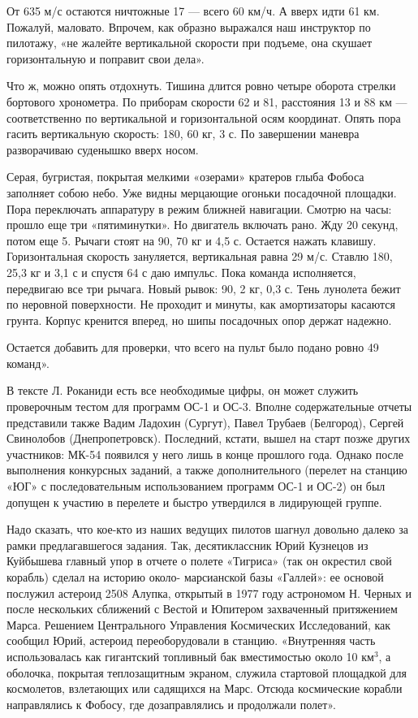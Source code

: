 \documentclass[11pt,a4paper,oneside]{article}
\begin{document}
От 635 м/с остаются ничтожные 17 — всего 60 км/ч. А вверх идти 61 км. Пожалуй, маловато. Впрочем, как образно выражался наш инструктор по пилотажу, «не жалейте вертикальной скорости при подъеме, она скушает горизонтальную и поправит свои дела».

Что ж, можно опять отдохнуть. Тишина длится ровно четыре оборота стрелки бортового хронометра. По приборам скорости 62 и 81, расстояния 13 и 88 км — соответственно по вертикальной и горизонтальной осям координат. Опять пора гасить вертикальную скорость: 180\degree, 60 кг, 3 с. По завершении маневра разворачиваю суденышко вверх носом.

Серая, бугристая, покрытая мелкими «озерами» кратеров глыба Фобоса заполняет собою небо. Уже видны мерцающие огоньки посадочной площадки. Пора переключать аппаратуру в режим ближней навигации. Смотрю на часы: прошло еще три «пятиминутки». Но двигатель включать рано. Жду 20 секунд, потом еще 5. Рычаги стоят на 90\degree, 70 кг и 4,5 с. Остается нажать клавишу. Горизонтальная скорость зануляется, вертикальная равна 29 м/с. Ставлю 180\degree, 25,3 кг и 3,1 с и спустя 64 с даю импульс. Пока команда исполняется, передвигаю все три рычага. Новый рывок: 90\degree, 2 кг, 0,3 с. Тень лунолета бежит по неровной поверхности. Не проходит и минуты, как амортизаторы касаются грунта. Корпус кренится вперед, но шипы посадочных опор держат надежно.

Остается добавить для проверки, что всего на пульт было подано ровно 49 команд».

В тексте Л. Роканиди есть все необходимые цифры, он может служить проверочным тестом для программ ОС-1 и ОС-3. Вполне содержательные отчеты представили также Вадим Ладохин (Сургут), Павел Трубаев (Белгород), Сергей Свинолобов (Днепропетровск). Последний, кстати, вышел на старт позже других участников: МК-54 появился у него лишь в конце прошлого года. Однако после выполнения конкурсных заданий, а также дополнительного (перелет на станцию «ЮГ» с последовательным использованием программ ОС-1 и ОС-2) он был допущен к участию в перелете и быстро утвердился в лидирующей группе.

Надо сказать, что кое-кто из наших ведущих пилотов шагнул довольно далеко за рамки предлагавшегося задания. Так, десятиклассник Юрий Кузнецов из Куйбышева главный упор в отчете о полете «Тигриса» (так он окрестил свой корабль) сделал на историю около- марсианской базы «Галлей»: ее основой послужил астероид 2508 Алупка, открытый в 1977 году астрономом Н. Черных и после нескольких сближений с Вестой и Юпитером захваченный притяжением Марса. Решением Центрального Управления Космических Исследований, как сообщил Юрий, астероид переоборудовали в станцию. «Внутренняя часть использовалась как гигантский топливный бак вместимостью около 10 км$^{3}$, а оболочка, покрытая теплозащитным экраном, служила стартовой площадкой для космолетов, взлетающих или садящихся на Марс. Отсюда космические корабли направлялись к Фобосу, где дозаправлялись и продолжали полет».
\end{document}

